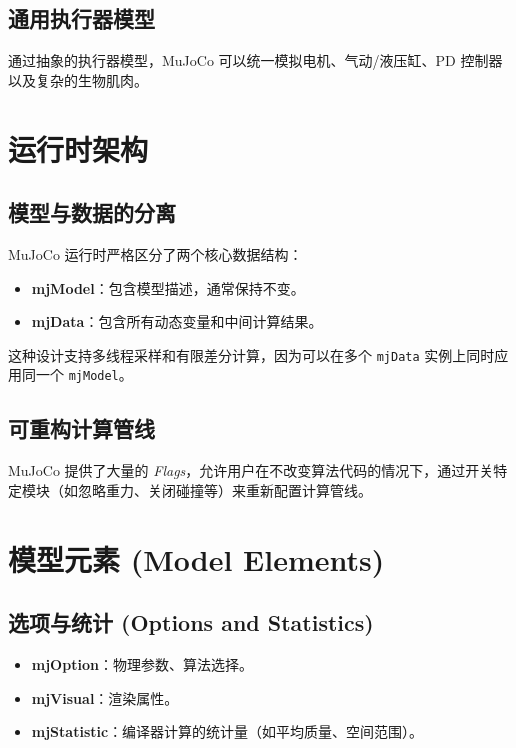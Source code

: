 \documentclass[11pt,a4paper]{book}
\begin{document}
\subsection{通用执行器模型}
通过抽象的执行器模型，MuJoCo 可以统一模拟电机、气动/液压缸、PD 控制器以及复杂的生物肌肉。

\section{运行时架构}

\subsection{模型与数据的分离}
MuJoCo 运行时严格区分了两个核心数据结构：
\begin{tcolorbox}[colback=gray!5, colframe=blue!75!black, title=数据分离设计]
\begin{itemize}
    \item \textbf{mjModel}：包含模型描述，通常保持不变。
    \item \textbf{mjData}：包含所有动态变量和中间计算结果。
\end{itemize}
\end{tcolorbox}

这种设计支持多线程采样和有限差分计算，因为可以在多个 \texttt{mjData} 实例上同时应用同一个 \texttt{mjModel}。

\subsection{可重构计算管线}
MuJoCo 提供了大量的 \textit{Flags}，允许用户在不改变算法代码的情况下，通过开关特定模块（如忽略重力、关闭碰撞等）来重新配置计算管线。

\section{模型元素 (Model Elements)}

\subsection{选项与统计 (Options and Statistics)}
\begin{itemize}
    \item \textbf{mjOption}：物理参数、算法选择。
    \item \textbf{mjVisual}：渲染属性。
    \item \textbf{mjStatistic}：编译器计算的统计量（如平均质量、空间范围）。
\end{itemize}
\end{document}
